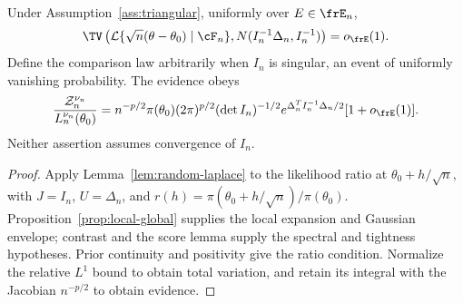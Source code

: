 \begin{theorem}
\label{thm:abstract-bvm}
Under Assumption~\ref{ass:triangular}, uniformly over \(E\in\frE_n\),
\begin{equation}
 \TV\left(\mathcal L\{\sqrt n(\theta-\theta_0)\mid\cF_n\},
 N(I_n^{-1}\Delta_n,I_n^{-1})\right)=o_{\frE}(1).
 \label{eq:abstract-bvm}
\end{equation}
Define the comparison law arbitrarily when \(I_n\) is singular, an event
of uniformly vanishing probability. The evidence obeys
\begin{equation}
 \frac{\mathcal Z_n^{\nu_n}}{L_n^{\nu_n}(\theta_0)}
 =n^{-p/2}\pi(\theta_0)(2\pi)^{p/2}(\det I_n)^{-1/2}
 e^{\Delta_n^TI_n^{-1}\Delta_n/2}[1+o_{\frE}(1)].
 \label{eq:abstract-evidence}
\end{equation}
Neither assertion assumes convergence of \(I_n\).
\end{theorem}
\begin{proof}
Apply Lemma~\ref{lem:random-laplace} to the likelihood ratio at
\(\theta_0+h/\sqrt n\), with \(J=I_n\), \(U=\Delta_n\), and
\(r(h)=\pi(\theta_0+h/\sqrt n)/\pi(\theta_0)\).
Proposition~\ref{prop:local-global} supplies the local expansion and
Gaussian envelope; contrast and the score lemma supply the spectral and
tightness hypotheses. Prior continuity and positivity give the ratio
condition. Normalize the relative \(L^1\) bound to obtain total variation,
and retain its integral with the Jacobian \(n^{-p/2}\) to obtain evidence.
\end{proof}
